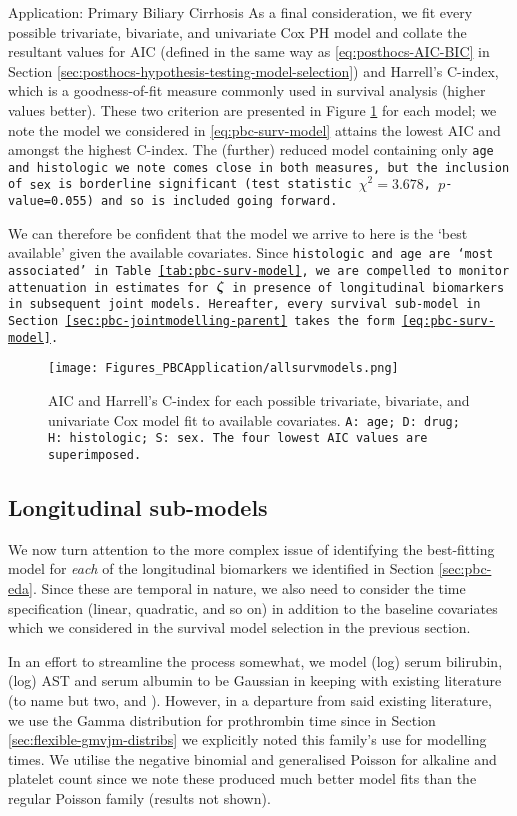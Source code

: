 \begin{chapter}{\label{cha:app-PBC}Application: Primary Biliary Cirrhosis}
  As a final consideration, we fit every possible trivariate, bivariate, and univariate Cox PH model and collate the resultant values for AIC (defined in the same way as \eqref{eq:posthocs-AIC-BIC} in Section \ref{sec:posthocs-hypothesis-testing-model-selection}) and Harrell's C-index, which is a goodness-of-fit measure commonly used in survival analysis (higher values better). These two criterion are presented in Figure \ref{fig:pbc-surv-allmodels} for each model; we note the model we considered in \eqref{eq:pbc-surv-model} attains the lowest AIC and amongst the highest C-index. The (further) reduced model containing only \tt{age} and \tt{histologic} we note comes close in both measures, but the inclusion of \tt{sex} is borderline significant (test statistic $\chi^2=3.678$, $p$-value=0.055) and so is included going forward.
  
  We can therefore be confident that the model we arrive to here is the `best available' given the available covariates. Since \tt{histologic} and \tt{age} are `most associated' in Table \ref{tab:pbc-surv-model}, we are compelled to monitor attenuation in estimates for $\bm{\zeta}$ in presence of longitudinal biomarkers in subsequent joint models. Hereafter, every survival sub-model in Section \ref{sec:pbc-jointmodelling-parent} takes the form \eqref{eq:pbc-surv-model}.
  \begin{figure}[ht]
      \centering
      \texttt{[image: Figures\_PBCApplication/allsurvmodels.png]}
      \caption{AIC and Harrell's C-index for each possible trivariate, bivariate, and univariate Cox model fit to available covariates. \tt{A}: \tt{age}; \tt{D}: \tt{drug}; \tt{H}: \tt{histologic}; \tt{S}: \tt{sex}. The four lowest AIC values are superimposed.}
      \label{fig:pbc-surv-allmodels}
  \end{figure}
  \subsection{Longitudinal sub-models}\label{sec:pbc-modelbuilding-longit}
  We now turn attention to the more complex issue of identifying the best-fitting model for \textit{each} of the longitudinal biomarkers we identified in Section \ref{sec:pbc-eda}. Since these are temporal in nature, we also need to consider the time specification (\eg linear, quadratic, and so on) in addition to the baseline covariates which we considered in the survival model selection in the previous section. 

  In an effort to streamline the process somewhat, we model (log) serum bilirubin, (log) AST and serum albumin to be Gaussian in keeping with existing literature (to name but two, \citet{Hickey2018} and \citet{Rustand2023}). However, in a departure from said existing literature, we use the Gamma distribution for prothrombin time since in Section \ref{sec:flexible-gmvjm-distribs} we explicitly noted this family's use for modelling times. We utilise the negative binomial and generalised Poisson for alkaline and platelet count since we note these produced much better model fits than the regular Poisson family (results not shown).


\end{chapter}
